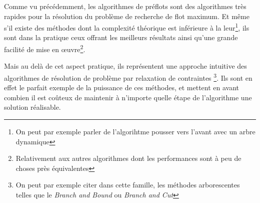 Comme vu précédemment, les algorithmes de préflots sont des algorithmes très rapides pour la
résolution du problème de recherche de flot maximum. Et même s'il existe des méthodes dont la
complexité théorique est inférieure à la leur\footnote{On peut par exemple parler de l'algorihtme
pousser vers l'avant avec un arbre dynamique}, ils sont dans la pratique ceux offrant les meilleurs
résultats ainsi qu'une grande facilité de mise en \oe uvre\footnote{Relativement aux autres
algorithmes dont les performances sont à peu de choses près équivalentes}.

Mais au delà de cet aspect pratique, ils
représentent une approche intuitive des algorithmes de résolution de problème par relaxation de
contraintes \footnote{On peut par exemple citer dans cette famille, les méthodes arborescentes
telles que le \emph{Branch and Bound} ou \emph{Branch and Cut}}. Ils sont en effet le parfait
exemple de la puissance de ces méthodes, et mettent en avant combien il est coûteux de maintenir à
n'importe quelle étape de l'algorithme une solution réalisable.

